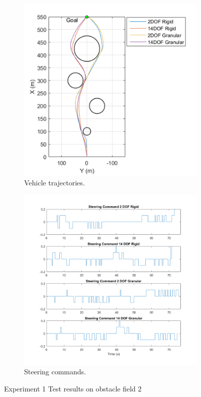\documentclass[12pt,onecolumn]{report}
\begin{document}
\begin{figure}
	\centering
	\begin{subfigure}[b]{0.49\columnwidth}
		\centering
		\includegraphics[height=\columnwidth]{Figs/ObstacleField2Trajectories.png}
		\caption{{\small Vehicle trajectories.}}   
		\label{fig:ObstacleField2Trajectories}
	\end{subfigure}
	\hfill
	\begin{subfigure}[b]{0.49\columnwidth}
		\centering
		\includegraphics[width=\columnwidth]{Figs/SteeringCommandsField2.png}
		\caption{\small Steering commands.}   
		\label{fig:SteeringCommandsField2}
	\end{subfigure}
	\caption{\small Experiment 1 Test results on obstacle field 2}
	\label{fig:Obst2TestData}
\end{figure}
\end{document}
